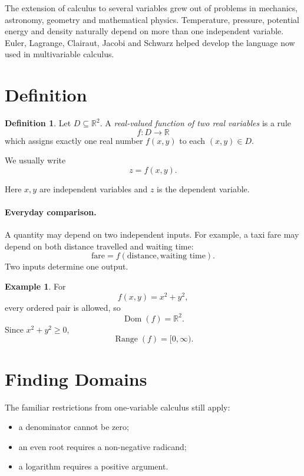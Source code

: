 \documentclass[11pt,oneside]{book}
\theoremstyle{studentthm}
\theoremstyle{definition}
\newtheorem{definition}[theorem]{Definition}
\newtheorem{example}[theorem]{Example}
\newcommand{\R}{\mathbb{R}}
\begin{document}
The extension of calculus to several variables grew out of problems in
mechanics, astronomy, geometry and mathematical physics. Temperature,
pressure, potential energy and density naturally depend on more than
one independent variable. Euler, Lagrange, Clairaut, Jacobi and
Schwarz helped develop the language now used in multivariable
calculus.

\section{Definition}

\begin{definition}
Let \(D\subseteq\R^2\). A \emph{real-valued function of two real
variables} is a rule
\[
f:D\longrightarrow\R
\]
which assigns exactly one real number \(f(x,y)\) to each
\((x,y)\in D\).
\end{definition}

We usually write
\[
z=f(x,y).
\]

Here \(x,y\) are independent variables and \(z\) is the dependent
variable.

\paragraph{Everyday comparison.}
A quantity may depend on two independent inputs. For example, a taxi
fare may depend on both distance travelled and waiting time:
\[
\text{fare}=f(\text{distance},\text{waiting time}).
\]
Two inputs determine one output.

\begin{example}
For
\[
f(x,y)=x^2+y^2,
\]
every ordered pair is allowed, so
\[
\operatorname{Dom}(f)=\R^2.
\]
Since \(x^2+y^2\ge0\),
\[
\operatorname{Range}(f)=[0,\infty).
\]
\end{example}

\section{Finding Domains}

The familiar restrictions from one-variable calculus still apply:
\begin{itemize}
\item a denominator cannot be zero;
\item an even root requires a non-negative radicand;
\item a logarithm requires a positive argument.
\end{itemize}
\end{document}
